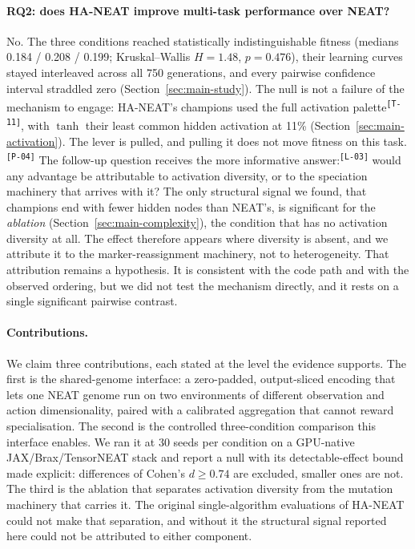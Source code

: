 \documentclass[12pt]{article}
\newcommand{\revID}[1]{\textsuperscript{\scriptsize\texttt{[#1]}}}
\newcommand{\revClarity}[2]{\textcolor{lrOrange}{#2}\revID{#1}} %
\newcommand{\revPlain}[2]{\textcolor{lrGreen}{#2}\revID{#1}}    %
\newcommand{\revTerm}[2]{\textcolor{lrTeal}{#2}\revID{#1}}      %
\begin{document}
\paragraph{RQ2: does HA-NEAT improve multi-task performance over NEAT?}
No.
The three conditions reached statistically indistinguishable fitness (medians 0.184 / 0.208 / 0.199; Kruskal--Wallis $H = 1.48$, $p = 0.476$), their learning curves stayed interleaved across all 750 generations, and every pairwise confidence interval straddled zero (Section~\ref{sec:main-study}).
The null is not a failure of the mechanism to engage: HA-NEAT's champions \revTerm{T-11}{used the full activation palette}, with $\tanh$ their least common hidden activation at 11\% (Section~\ref{sec:main-activation}).
\revPlain{P-04}{The lever is pulled, and pulling it does not move fitness on this task.}
\revClarity{L-03}{The follow-up question receives the more informative answer:} would any advantage be attributable to activation diversity, or to the speciation machinery that arrives with it?
The only structural signal we found, that champions end with fewer hidden nodes than NEAT's, is significant for the \emph{ablation} (Section~\ref{sec:main-complexity}), the condition that has no activation diversity at all.
The effect therefore appears where diversity is absent, and we attribute it to the marker-reassignment machinery, not to heterogeneity.
That attribution remains a hypothesis. It is consistent with the code path and with the observed ordering, but we did not test the mechanism directly, and it rests on a single significant pairwise contrast.

\paragraph{Contributions.}
We claim three contributions, each stated at the level the evidence supports.
The first is the shared-genome interface: a zero-padded, output-sliced encoding that lets one NEAT genome run on two environments of different observation and action dimensionality, paired with a calibrated aggregation that cannot reward specialisation.
The second is the controlled three-condition comparison this interface enables. We ran it at 30 seeds per condition on a GPU-native JAX/Brax/TensorNEAT stack and report a null with its detectable-effect bound made explicit: differences of Cohen's $d \geq 0.74$ are excluded, smaller ones are not.
The third is the ablation that separates activation diversity from the mutation machinery that carries it. The original single-algorithm evaluations of HA-NEAT could not make that separation, and without it the structural signal reported here could not be attributed to either component.
\end{document}
